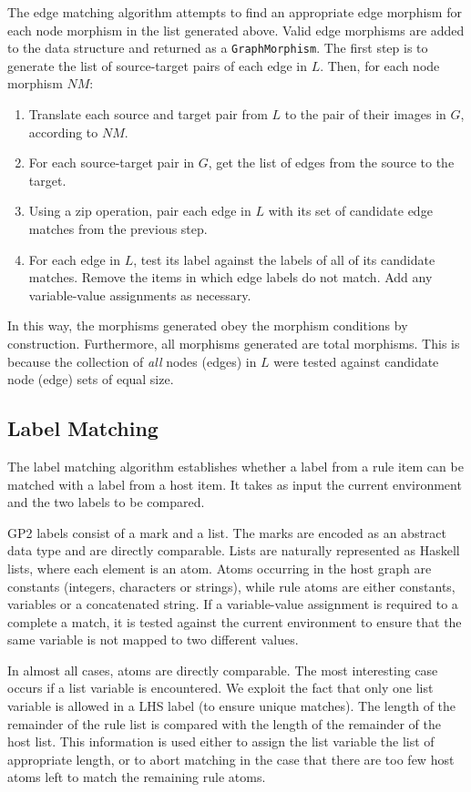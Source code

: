 The edge matching algorithm attempts to find an appropriate edge morphism for each node morphism in the list generated above. Valid edge morphisms are added to the data structure and returned as a \texttt{GraphMorphism}. The first step is to generate the list of source-target pairs of each edge in $L$. Then, for each node morphism $NM$:

\begin{enumerate}
\item Translate each source and target pair from $L$ to the pair of their images in $G$, according to $NM$.
\item For each source-target pair in $G$, get the list of edges from the source to the target.
\item Using a zip operation, pair each edge in $L$ with its set of candidate edge matches from the previous step.
\item For each edge in $L$, test its label against the labels of all of its candidate matches. Remove the items in which edge labels do not match. Add any variable-value assignments as necessary.
\end{enumerate}

In this way, the morphisms generated obey the morphism conditions by construction. Furthermore, all morphisms generated are total morphisms. This is because the collection of \textit{all} nodes (edges) in $L$ were tested against candidate node (edge) sets of equal size.


\subsection{Label Matching}

The label matching algorithm establishes whether a label from a rule item can be matched with a label from a host item. It takes as input the current environment and the two labels to be compared. 

GP2 labels consist of a mark and a list. The marks are encoded as an abstract data type and are directly comparable. Lists are naturally represented as Haskell lists, where each element is an atom. Atoms occurring in the host graph are constants (integers, characters or strings), while rule atoms are either constants, variables or a concatenated string. If a variable-value assignment is required to a complete a match, it is tested against the current environment to ensure that the same variable is not mapped to two different values. 

In almost all cases, atoms are directly comparable. The most interesting case occurs if a list variable is encountered. We exploit the fact that only one list variable is allowed in a LHS label (to ensure unique matches). The length of the remainder of the rule list is compared with the length of the remainder of the host list. This information is used either to assign the list variable the list of appropriate length, or to abort matching in the case that there are too few host atoms left to match the remaining rule atoms.

